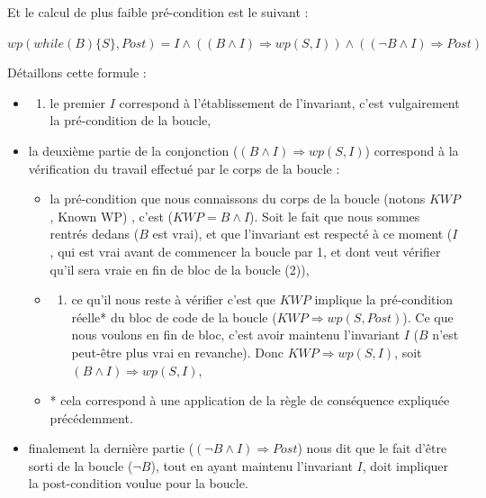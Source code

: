 \documentclass[12pt,francais,]{scrbook}
\providecommand{\tightlist}{%
  \setlength{\itemsep}{0pt}\setlength{\parskip}{0pt}}
\begin{document}
Et le calcul de plus faible pré-condition est le suivant :

\begin{center}
\(wp(while (B) \{ S \}, Post) = I \wedge ((B \wedge I) \Rightarrow wp(S, I)) \wedge ((\neg B \wedge I) \Rightarrow Post)\)
\end{center}

Détaillons cette formule :

\begin{itemize}
\item
  \begin{enumerate}
  \def\labelenumi{(\arabic{enumi})}
  \tightlist
  \item
    le premier \(I\) correspond à l'établissement de l'invariant, c'est
    vulgairement la \og{}pré-condition\fg{} de la boucle,
  \end{enumerate}
\item
  la deuxième partie de la conjonction
  (\((B \wedge I) \Rightarrow wp(S, I)\)) correspond à la vérification
  du travail effectué par le corps de la boucle :

  \begin{itemize}
  \item
    la pré-condition que nous connaissons du corps de la boucle (notons
    \(KWP\), \og{}Known WP\fg{}) , c'est (\(KWP = B \wedge I\)). Soit le fait
    que nous sommes rentrés dedans (\(B\) est vrai), et que l'invariant
    est respecté à ce moment (\(I\), qui est vrai avant de commencer la
    boucle par 1, et dont veut vérifier qu'il sera vraie en fin de bloc
    de la boucle (2)),
  \item
    \begin{enumerate}
    \def\labelenumi{(\arabic{enumi})}
    \setcounter{enumi}{1}
    \tightlist
    \item
      ce qu'il nous reste à vérifier c'est que \(KWP\) implique la
      pré-condition réelle* du bloc de code de la boucle
      (\(KWP \Rightarrow wp(S, Post)\)). Ce que nous voulons en fin de
      bloc, c'est avoir maintenu l'invariant \(I\) (\(B\) n'est
      peut-être plus vrai en revanche). Donc
      \(KWP \Rightarrow wp(S, I)\), soit
      \((B \wedge I) \Rightarrow wp(S, I)\),
    \end{enumerate}
  \item
    * cela correspond à une application de la règle de conséquence
    expliquée précédemment.
  \end{itemize}
\item
  finalement la dernière partie (\((\neg B \wedge I) \Rightarrow Post\))
  nous dit que le fait d'être sorti de la boucle (\(\neg B\)), tout en
  ayant maintenu l'invariant \(I\), doit impliquer la post-condition
  voulue pour la boucle.
\end{itemize}
\end{document}
